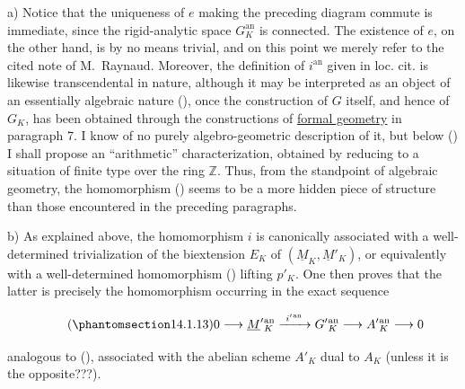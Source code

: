 \smallskip
\noindent
a) Notice that the uniqueness of $e$ making the preceding diagram
commute is immediate, since the rigid-analytic space
$G_K^{\mathrm{an}}$ is connected.  The existence of $e$, on the other
hand, is by no means trivial, and on this point we merely refer to the
cited note of M.~Raynaud.  Moreover, the definition of
$i^{\mathrm{an}}$ given in loc. cit. is likewise transcendental in
nature, although it may be interpreted as an object of an essentially
algebraic nature (), once the construction of $G$ itself, and
hence of $G_K$, has been obtained through the constructions of
\underline{formal geometry} in paragraph 7.  I know of no purely
algebro-geometric description of it, but below () I shall propose
an ``arithmetic'' characterization, obtained by reducing to a situation
of finite type over the ring $\mathbb Z$.  Thus, from the standpoint of
algebraic geometry, the homomorphism () seems to be a more hidden
piece of structure than those encountered in the preceding paragraphs.

\smallskip
\noindent
b) As explained above, the homomorphism $i$ is canonically associated
with a well-determined trivialization of the biextension $E_K$ of
$(\underline M_K,\underline M'_K)$, or equivalently with a
well-determined homomorphism () lifting $p'_K$.  One then proves
that the latter is precisely the homomorphism occurring in the exact
sequence

\begin{equation}\tag{\SGARefTarget{sga7.sga7i.eix.n14-1-13}{14.1.13}}
 0\longrightarrow\underline M'{}^{\mathrm{an}}_K
 \xrightarrow{\ i'{}^{\mathrm{an}}\ }G'{}^{\mathrm{an}}_K
 \longrightarrow A'{}^{\mathrm{an}}_K\longrightarrow0
\end{equation}

\noindent
analogous to (), associated with the abelian scheme $A'_K$ dual
to $A_K$ (unless it is the opposite???).
